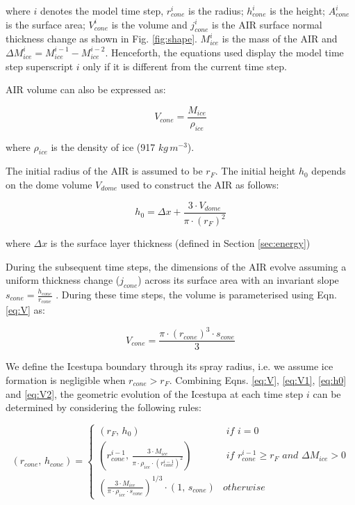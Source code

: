 \documentclass[utf8]{frontiersSCNS}
\begin{document}
where $i$ denotes the model time step, $r_{cone}^i$ is the radius; $h_{cone}^i$ is the height; $A_{cone}^i$ is
the surface area; $V_{cone}^i$ is the volume and $j_{cone}^i$ is the AIR surface normal thickness change as shown
in Fig. \ref{fig:shape}. $M_{ice}^i$ is the mass of the AIR and $\Delta M_{ice}^i = M_{ice}^{i-1} -
M_{ice}^{i-2}$. Henceforth, the equations used display the model time step superscript $i$ only if it is different
from the current time step.

AIR volume can also be expressed as:

\begin{equation} V_{cone} =\frac{M_{ice}} {\rho_{ice}} \label{eq:V1} \end{equation}

where $\rho_{ice}$ is the density of ice (917 $kg\, m^{-3}$). 

The initial radius of the AIR is assumed to be $r_F$. The initial height $h_0$ depends on the dome volume
$V_{dome}$ used to construct the AIR as follows:

\begin{equation}
	h_{0} =  \Delta x + \frac{3 \cdot V_{dome}}{\pi \cdot (r_F)^2 }
	\label{eq:h0}
\end{equation}

where $\Delta x$ is the surface layer thickness (defined in Section \ref{sec:energy})

During the subsequent time steps, the dimensions of the AIR evolve assuming a uniform thickness change ($j_{cone}$)
across its surface area with an invariant slope $s_{cone} = \frac{h_{cone}}{r_{cone}}$ .  During these time
steps, the volume is parameterised using Eqn. \ref{eq:V} as:

\begin{equation} V_{cone} = \frac{\pi \cdot {(r_{cone})}^3
		\cdot s_{cone}}{3} \label{eq:V2} \end{equation}

We define the Icestupa boundary through its spray radius, i.e. we assume ice formation is negligible when $r_{cone} >
	r_{F}$. Combining Eqns. \ref{eq:V},  \ref{eq:V1}, \ref{eq:h0} and \ref{eq:V2}, the geometric evolution of the
Icestupa at each time step $i$ can be determined by considering the following rules:

\begin{equation} (r_{cone},\, h_{cone}) = \left\{ \begin{array}{ll} (r_F ,\, h_0)                                                                          & \textit{ if } i=0 \\
		(r_{cone}^{i-1},\, \frac{3 \cdot M_{ice}}{\pi \cdot \rho_{ice} \cdot {(r_{cone}^{i-1})}^2}) & \textit{ if }
		r_{cone}^{i-1} \geq r_{F} \textit{ and } \Delta M_{ice} > 0                                                     \\ (\frac{3 \cdot M_{ice}}{\pi \cdot \rho_{ice} \cdot s_{cone}})^{1/3} \cdot (1,\,  s_{cone}) &
		otherwise\end{array} \right.  \label{eq:A2} \end{equation}
\end{document}
